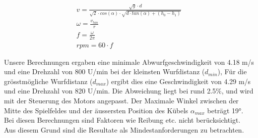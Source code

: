 \begin{gather}
	v=\frac{\sqrt{g} \cdot d}{\sqrt{2} \cdot cos(\alpha) \cdot \sqrt{d \cdot tan(\alpha)+(h_0-h_1)}}\\
	\omega=\frac{v_{tan}}{r}\\
	f=\frac{\omega}{2\pi}\\
	rpm=60 \cdot f
\end{gather}

Unsere Berechnungen ergaben eine minimale Abwurfgeschwindigkeit von 4.18 m/s und eine Drehzahl von 800 U/min bei der kleinsten Wurfdistanz ($d_{min}$), 
Für die grösstmögliche Wurfdistanz ($d_{max}$) ergibt dies  eine Geschwindigkeit von 4.29 m/s und eine Drehzahl von 820 U/min. 
Die Abweichung liegt bei rund 2.5\%, und wird mit der Steuerung des Motors angepasst.
Der Maximale Winkel zwischen der Mitte des Spielfeldes und der äussersten Position des Kübels $\alpha_{max}$ beträgt 19°. \\
Bei diesen Berechnungen sind Faktoren wie Reibung etc. nicht berücksichtigt. Aus diesem Grund sind die Resultate als Mindestanforderungen zu betrachten.
